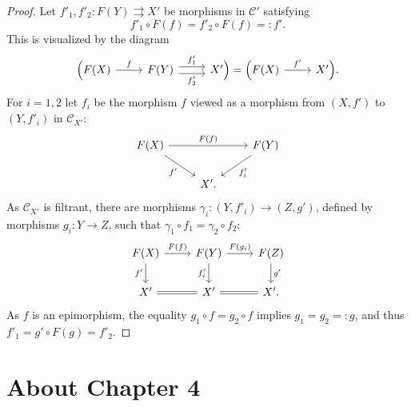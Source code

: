 \documentclass[12pt]{article}%
\theoremstyle{remark}
\theoremstyle{definition}
\newcommand{\C}{\mathcal C}
\begin{document}
\begin{proof}
Let $f'_1,f'_2:F(Y)\rightrightarrows X'$ be morphisms in $\C'$ satisfying 
$$
f'_1\circ F(f)=f'_2\circ F(f)=:f'.
$$
This is visualized by the diagram
$$
\begin{tikzcd}
\Big(F(X)\ar{r}{f}&F(Y)\ar[yshift=.7ex]{r}{f'_1}\ar[yshift=-.7ex]{r}[swap]{f'_2}&X'\Big)=\Big(F(X)\ar{r}{f'}&X'\Big).
\end{tikzcd}
$$ 
For $i=1,2$ let $f_i$ be the morphism $f$ viewed as a morphism from $(X,f')$ to $(Y,f'_i)$ in $\C_{X'}$: 
$$
\begin{tikzcd}
F(X)\ar{dr}[swap]{f'}\ar{rr}{F(f)}&&F(Y)\ar{dl}{f'_i}\\ 
{}&X'.
\end{tikzcd}
$$
As $\C_{X'}$ is filtrant, there are morphisms $\gamma_i:(Y,f'_i)\to(Z,g')$, defined by morphisms $g_i:Y\to Z$, such that $\gamma_1\circ f_1=\gamma_2\circ f_2$:
$$
\begin{tikzcd}
F(X)\ar{d}[swap]{f'}\ar{r}{F(f)}&F(Y)\ar{d}[swap]{f'_i}\ar{r}{F(g_i)}&F(Z)\ar{d}{g'}\\ 
X'\ar[equal]{r}&X'\ar[equal]{r}&X'.
\end{tikzcd}
$$
As $f$ is an epimorphism, the equality $g_1\circ f=g_2\circ f$ implies $g_1=g_2=:g$, and thus $f'_1=g'\circ F(g)=f'_2$.
\end{proof}


\section{About Chapter 4}
\end{document}
